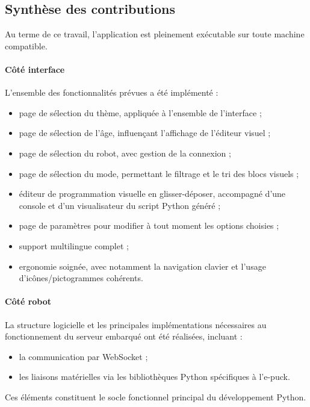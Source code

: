 \subsection{Synthèse des contributions} \label{sec:synthese_contribs}

Au terme de ce travail, l'application est pleinement exécutable sur toute machine compatible.

\paragraph{Côté interface}  
L’ensemble des fonctionnalités prévues a été implémenté :
\begin{itemize}
    \item page de sélection du thème, appliquée à l’ensemble de l’interface ;
    \item page de sélection de l’âge, influençant l’affichage de l’éditeur visuel ;
    \item page de sélection du robot, avec gestion de la connexion ;
    \item page de sélection du mode, permettant le filtrage et le tri des blocs visuels ;
    \item éditeur de programmation visuelle en glisser-déposer, accompagné d’une console et d’un visualisateur du script Python généré ;
    \item page de paramètres pour modifier à tout moment les options choisies ;
    \item support multilingue complet ;
    \item ergonomie soignée, avec notamment la navigation clavier et l’usage d’icônes/pictogrammes cohérents.
\end{itemize}

\paragraph{Côté robot}  
La structure logicielle et les principales implémentations nécessaires au fonctionnement du serveur embarqué ont été réalisées, incluant :
\begin{itemize}
    \item la communication par WebSocket ;
    \item les liaisons matérielles via les bibliothèques Python spécifiques à l’e-puck.
\end{itemize}
Ces éléments constituent le socle fonctionnel principal du développement Python.
